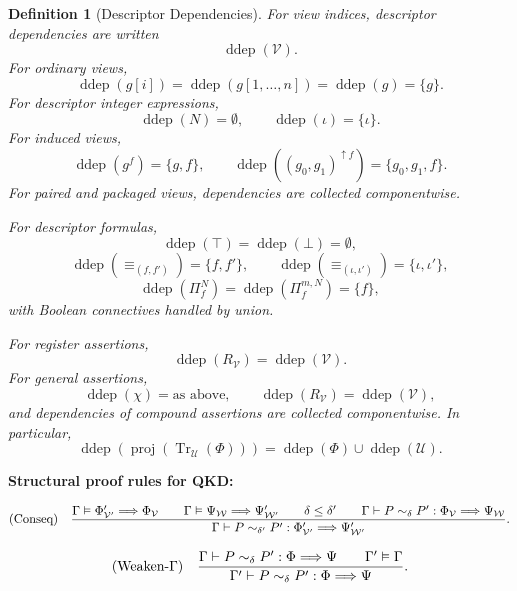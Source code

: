 \documentclass[acmsmall,screen,review,anonymous,nonacm]{acmart}
\newtheorem{definition}{Definition}[section]
\theoremstyle{defn_style}
\begin{document}
  \begin{definition}[Descriptor Dependencies]
    For view indices, descriptor dependencies are written
    \[
    \operatorname{ddep}(\mathcal V).
    \]
    For ordinary views,
    \[
    \operatorname{ddep}(g[i])
    =
    \operatorname{ddep}(g[1,\ldots,n])
    =
    \operatorname{ddep}(g)
    =
    \{g\}.
    \]
    For descriptor integer expressions,
    \[
    \operatorname{ddep}(N)=\emptyset,
    \qquad
    \operatorname{ddep}(\iota)=\{\iota\}.
    \]
    For induced views,
    \[
    \operatorname{ddep}(g^{f})
    =
    \{g,f\},
    \qquad
    \operatorname{ddep}((g_0,g_1)^{\uparrow f})
    =
    \{g_0,g_1,f\}.
    \]
    For paired and packaged views, dependencies are collected componentwise.
    
    For descriptor formulas,
    \[
    \operatorname{ddep}(\top)
    =
    \operatorname{ddep}(\bot)
    =
    \emptyset,
    \]
    \[
    \operatorname{ddep}(\equiv_{(f,f')})
    =
    \{f,f'\},
    \qquad
    \operatorname{ddep}(\equiv_{(\iota,\iota')})
    =
    \{\iota,\iota'\},
    \]
    \[
    \operatorname{ddep}(\Pi_f^N)
    =
    \operatorname{ddep}(\Pi_f^{m,N})
    =
    \{f\},
    \]
    with Boolean connectives handled by union.
    
    For register assertions,
    \[
    \operatorname{ddep}(R_{\mathcal V})
    =
    \operatorname{ddep}(\mathcal V).
    \]
    For general assertions,
    \[
    \operatorname{ddep}(\chi)
    =
    \text{as above},
    \qquad
    \operatorname{ddep}(R_{\mathcal V})
    =
    \operatorname{ddep}(\mathcal V),
    \]
    and dependencies of compound assertions are collected componentwise. In
    particular,
    \[
    \operatorname{ddep}
    \left(
    \operatorname{proj}
    \left(
    \operatorname{Tr}_{\mathcal U}(\Phi)
    \right)
    \right)
    =
    \operatorname{ddep}(\Phi)\cup\operatorname{ddep}(\mathcal U).
    \]
    \end{definition}

\textbf{Structural proof rules for QKD:}

\[
\text{\rm (Conseq)}
\quad
\frac{
\Gamma
\vDash
\Phi'_{\mathcal V'}
\Longrightarrow
\Phi_{\mathcal V}
\qquad
\Gamma
\vDash
\Psi_{\mathcal W}
\Longrightarrow
\Psi'_{\mathcal W'}
\qquad
\delta\leq\delta'
\qquad
\Gamma
\vdash
P\sim_{\delta}P':
\Phi_{\mathcal V}
\Longrightarrow
\Psi_{\mathcal W}
}{
\Gamma
\vdash
P\sim_{\delta'}P':
\Phi'_{\mathcal V'}
\Longrightarrow
\Psi'_{\mathcal W'}
}.
\]

\[
\text{\rm (Weaken-\(\Gamma\))}
\quad
\frac{
\Gamma
\vdash
P\sim_{\delta}P':
\Phi\Longrightarrow\Psi
\qquad
\Gamma'\vDash\Gamma
}{
\Gamma'
\vdash
P\sim_{\delta}P':
\Phi\Longrightarrow\Psi
}.
\]
\end{document}
